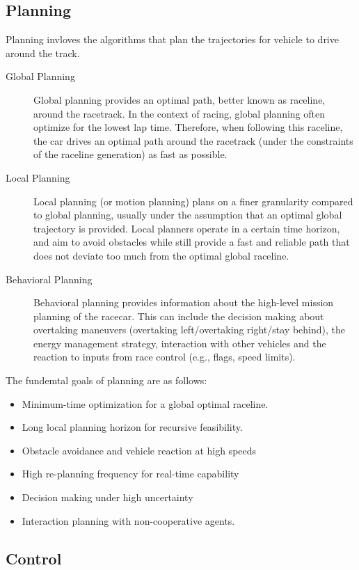 \subsection{Planning}
Planning invloves the algorithms that plan the trajectories for vehicle to drive around the track.\cite{johan22} 
\begin{description}
	\item[Global Planning] Global planning provides an optimal path, better known as raceline, around the racetrack. In the context of racing, global planning often optimize for the lowest lap time. Therefore, when following this raceline, the car drives an optimal path around the racetrack (under the constraints of the raceline generation) as fast as possible. \cite{johan22}
	\item[Local Planning] Local planning (or motion planning) plans on a finer granularity compared to global planning, usually under the assumption that an optimal global trajectory is provided. Local planners operate in a certain time horizon, and aim to avoid obstacles while still provide a fast and reliable path that does not deviate too much from the optimal global raceline. \cite{johan22}
	\item[Behavioral Planning] Behavioral planning provides information about the high-level mission planning of the racecar. This can include the decision making about overtaking maneuvers (overtaking left/overtaking right/stay behind), the energy management strategy, interaction with other vehicles and the reaction to inputs from race control (e.g., flags, speed limits). \cite{johan22}

\end{description}

The fundemtal goals of planning are as follows:\cite{johan22}
\begin{itemize}
	\item Minimum-time optimization for a global optimal raceline.
	\item Long local planning horizon for recursive feasibility.
	\item Obstacle avoidance and vehicle reaction at high speeds
	\item High re-planning frequency for real-time capability
	\item Decision making under high uncertainty
	\item Interaction planning with non-cooperative agents.
\end{itemize} 



\subsection{Control}

